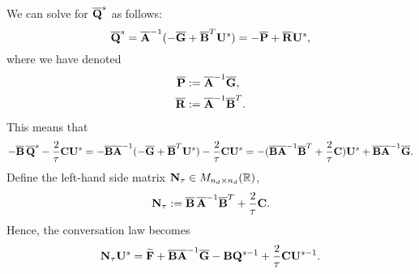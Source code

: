 \begin{discussion}
  We can solve for $\overline{\bf Q}^s$ as follows:
  \begin{equation}
    \overline{\bf Q}^s
    = \overline{\bf A}^{-1}
      (- \overline{\bf G} + \overline{\bf B}^T {\bf U}^s)
    = - \overline{\bf P} + \overline{\bf R} {\bf U}^s,
  \end{equation}
  where we have denoted
  \begin{align}
    \overline{\bf P} & := \overline{\bf A}^{-1} \overline{\bf G}, \\
    \overline{\bf R} & := \overline{\bf A}^{-1} \overline{\bf B}^T.
  \end{align}
  This means that
  \begin{equation}
    - \overline{\bf B}\, \overline{\bf Q}^s - \frac{2}{\tau} {\bf C} {\bf U}^s
    = - \overline{\bf B}
      \overline{\bf A}^{-1} (- \overline{\bf G} + \overline{\bf B}^T {\bf U}^s)
    - \frac{2}{\tau} {\bf C} {\bf U}^s
    = - (\overline{\bf B} \overline{\bf A}^{-1} \overline{\bf B}^T
      + \frac{2}{\tau} {\bf C}) {\bf U}^s
      + \overline{\bf B} \overline{\bf A}^{-1} \overline{\bf G}.
  \end{equation}
  Define the left-hand side matrix ${\bf N}_\tau \in M_{n_d \times n_d}(\mathbb{R})$,
  \begin{equation}
    {\bf N}_\tau
    := \overline{\bf B}\, \overline{\bf A}^{-1} \overline{\bf B}^T
      + \frac{2}{\tau} {\bf C}.
  \end{equation}
  Hence, the conversation law becomes
  \begin{equation}
    {\bf N}_\tau {\bf U}^s
    = \widetilde{\bf F}
    + \overline{\bf B} \overline{\bf A}^{-1} \overline{\bf G} 
    - {\bf B} {\bf Q}^{s - 1}
    + \frac{2}{\tau} {\bf C} {\bf U}^{s - 1}.
  \end{equation}

\end{discussion}
